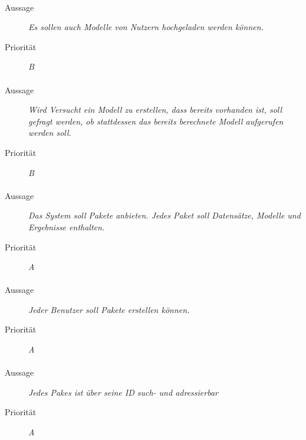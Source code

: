 \paragraph{}
\begin{description}
\item[Aussage] \textit{Es sollen auch Modelle von Nutzern hochgeladen werden können.}
\item[Priorität] \textit{B}
\end{description}

\paragraph{}
\begin{description}
\item[Aussage] \textit{Wird Versucht ein Modell zu erstellen, dass bereits vorhanden ist, soll gefragt werden, ob stattdessen das bereits berechnete Modell aufgerufen werden soll.}
\item[Priorität] \textit{B}
\end{description}




\paragraph{}
\begin{description}
\item [Aussage] \textit{Das System soll Pakete anbieten. Jedes Paket soll Datensätze, Modelle und Ergebnisse enthalten.}
\item [Priorität] \textit{A}
\end{description}

\paragraph{}
\begin{description}
\item[Aussage] \textit{Jeder Benutzer soll Pakete erstellen können.}
\item[Priorität] \textit{A}
\end{description}

\paragraph{}
\begin{description}
\item[Aussage] \textit{Jedes Pakes ist über seine ID such- und adressierbar}
\item[Priorität] \textit{A}
\end{description}

